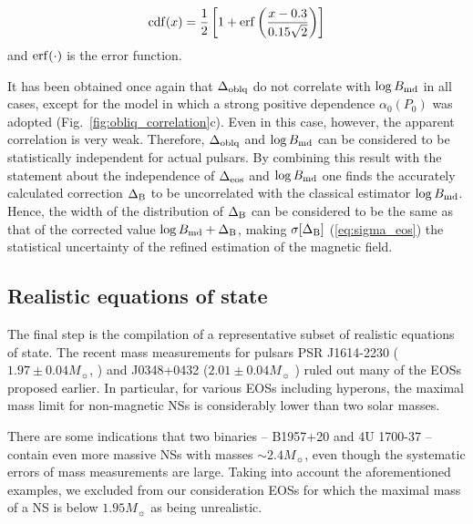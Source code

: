 \documentclass[fleqn,usenatbib]{mnras}
\begin{document}
\begin{equation}
	{\rm cdf}(x) = \dfrac{1}{2}\left[ 1 + {\rm erf} \left( \dfrac{x - 0.3}{0.15\sqrt{2}}\right) \right ]
\end{equation}
and ${\rm erf}(\cdot)$ is the error function.

It has been obtained once again that $\Delta_{\rm oblq}$ do not correlate
with $\log B_{\rm md}$ in all cases, except for the model in which a strong positive dependence $\alpha_0(P_0)$ was adopted (Fig.~\ref{fig:obliq_correlation}c). Even in this
case, however, the apparent correlation is very weak. Therefore,
$\Delta_{\rm oblq}$ and $\log B_{\rm md}$ can be considered to be statistically independent
for actual pulsars. By combining this result with the statement about
the independence of $\Delta_{\rm eos}$
 and $\log B_{\rm md}$ one finds the accurately calculated correction $\Delta_{\rm B}$ to be uncorrelated with the classical estimator
$\log B_{\rm md}$. Hence, the width of the distribution of $\Delta_{\rm B}$ can be considered
to be the same as that of the corrected value $\log B_{\rm md} + \Delta_{\rm B}$, making
$\sigma[\Delta_{\rm B}]$ (\ref{eq:sigma_eos}) the statistical uncertainty of the refined estimation of the
magnetic field.



\subsection{Realistic equations of state}
\label{sect:eos}

The final step is the compilation of a representative subset of realistic equations of state. The recent mass measurements for pulsars
 PSR J1614-2230  ($1.97\pm 0.04M_{\sun}$,
\cite{Demorest}) and  J0348+0432 ($2.01\pm 0.04 M_{\sun}$
\cite{Antoniadis}) ruled out
many of the EOSs proposed earlier. In particular, for various EOSs
including hyperons, the maximal mass limit for non-magnetic NSs
is considerably lower than two solar masses.

There are some indications that two binaries -- B1957+20 \citep{Kerk} and
4U 1700-37 \citep{clark02} -- contain even more massive NSs with
masses $\sim 2.4M_{\sun}$, even though the systematic errors of mass measurements are large. Taking into account the aforementioned examples, we excluded from 
our consideration EOSs for which the
maximal mass of a NS is below $1.95M_{\sun}$ as being unrealistic.
\end{document}
